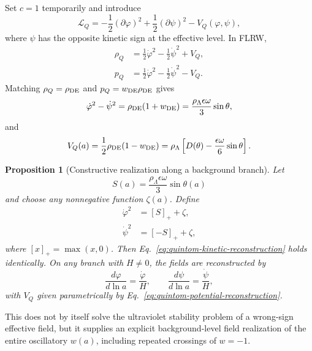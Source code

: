 \documentclass[11pt]{article}
\newtheorem{proposition}{Proposition}
\theoremstyle{remark}
\begin{document}
Set $c=1$ temporarily and introduce
\begin{equation}
 \mathcal L_Q
 =-\frac12(\partial\varphi)^2
 +\frac12(\partial\psi)^2
 -V_Q(\varphi,\psi),
 \label{eq:quintom-L}
\end{equation}
where $\psi$ has the opposite kinetic sign at the effective level. In FLRW,
\begin{align}
 \rho_Q&=\frac12\dot\varphi^2-\frac12\dot\psi^2+V_Q,\\
 p_Q&=\frac12\dot\varphi^2-\frac12\dot\psi^2-V_Q.
\end{align}
Matching $\rho_Q=\rho_{\rm DE}$ and $p_Q=w_{\rm DE}\rho_{\rm DE}$ gives
\begin{equation}
 \dot\varphi^2-\dot\psi^2
 =\rho_{\rm DE}(1+w_{\rm DE})
 =\frac{\rho_\Lambda\epsilon\omega}{3}\sin\theta,
 \label{eq:quintom-kinetic-reconstruction}
\end{equation}
and
\begin{equation}
 V_Q(a)
 =\frac12\rho_{\rm DE}(1-w_{\rm DE})
 =\rho_\Lambda\left[D(\theta)-\frac{\epsilon\omega}{6}\sin\theta\right].
 \label{eq:quintom-potential-reconstruction}
\end{equation}

\begin{proposition}[Constructive realization along a background branch]
Let
\begin{equation}
 S(a)=\frac{\rho_\Lambda\epsilon\omega}{3}\sin\theta(a)
\end{equation}
and choose any nonnegative function $\zeta(a)$. Define
\begin{align}
 \dot\varphi^2&=[S]_++\zeta,\\
 \dot\psi^2&=[-S]_++\zeta,
\end{align}
where $[x]_+=\max(x,0)$. Then Eq.~\eqref{eq:quintom-kinetic-reconstruction} holds identically. On any branch with $H\neq0$, the fields are reconstructed by
\begin{equation}
 \frac{d\varphi}{d\ln a}=\frac{\dot\varphi}{H},
 \qquad
 \frac{d\psi}{d\ln a}=\frac{\dot\psi}{H},
 \label{eq:quintom-field-reconstruction}
\end{equation}
with $V_Q$ given parametrically by Eq.~\eqref{eq:quintom-potential-reconstruction}.
\end{proposition}

This does not by itself solve the ultraviolet stability problem of a wrong-sign effective field, but it supplies an explicit background-level field realization of the entire oscillatory $w(a)$, including repeated crossings of $w=-1$.
\end{document}
